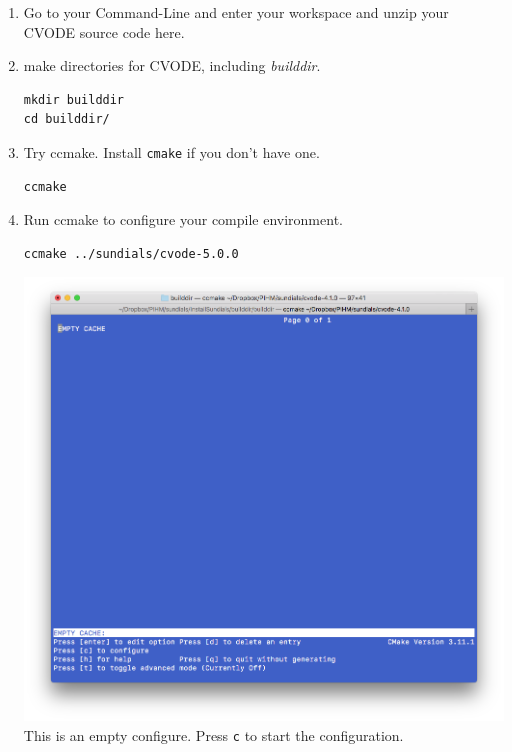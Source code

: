 \documentclass[]{scrbook}
\begin{document}
\begin{enumerate}
\def\labelenumi{\arabic{enumi}.}
\item
  Go to your Command-Line and enter your workspace and unzip your CVODE
  source code here.
\item
  make directories for CVODE, including \emph{builddir}.

\begin{verbatim}
mkdir builddir
cd builddir/
\end{verbatim}
\item
  Try ccmake. Install \texttt{cmake} if you don't have one.

\begin{verbatim}
ccmake 
\end{verbatim}
\item
  Run ccmake to configure your compile environment.

\begin{verbatim}
ccmake ../sundials/cvode-5.0.0
\end{verbatim}

  \includegraphics{Fig/ccmake/1.png} This is an empty configure. Press
  \texttt{c} to start the configuration.
\end{enumerate}
\end{document}
